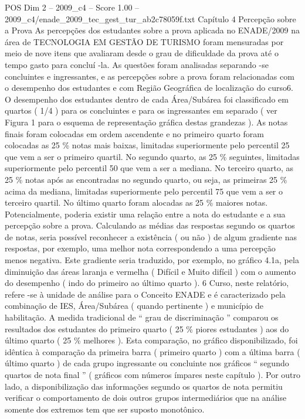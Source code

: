 \begin{textsample}{POS Dim 2 – 2009\_c4 – Score 1.00 – 2009\_c4/enade\_2009\_tec\_gest\_tur\_ab2c78059f.txt}  \label{ex:f2_pos_204}
Capítulo 4 Percepção sobre a Prova As percepções dos estudantes sobre a prova aplicada no ENADE/2009 na área de TECNOLOGIA EM GESTÃO DE TURISMO foram mensuradas por meio de nove itens que avaliaram desde o grau de dificuldade da prova até o tempo gasto para concluí -la.
As questões foram analisadas separando -se concluintes e ingressantes, e as percepções sobre a prova foram relacionadas com o desempenho dos estudantes e com Região Geográfica de localização do curso6.
O desempenho dos estudantes dentro de cada Área/Subárea foi classificado em quartos ( 1/4 ) para os concluintes e para os ingressantes em separado ( ver Figura 1 para o esquema de representação gráfica destas grandezas ).
As notas finais foram colocadas em ordem ascendente e no primeiro quarto foram colocadas as 25 \% notas mais baixas, limitadas superiormente pelo percentil 25 que vem a ser o primeiro quartil.
No segundo quarto, as 25 \% seguintes, limitadas superiormente pelo percentil 50 que vem a ser a mediana.
No terceiro quarto, as 25 \% notas após as encontradas no segundo quarto, ou seja, as primeiras 25 \% acima da mediana, limitadas superiormente pelo percentil 75 que vem a ser o terceiro quartil.
No último quarto foram alocadas as 25 \% maiores notas.
Potencialmente, poderia existir uma relação entre a nota do estudante e a sua percepção sobre a prova.
Calculando as médias das respostas segundo os quartos de notas, seria possível reconhecer a existência ( ou não ) de algum gradiente nas respostas, por exemplo, uma melhor nota correspondendo a uma percepção menos negativa.
Este gradiente seria traduzido, por exemplo, no gráfico 4.1a, pela diminuição das áreas laranja e vermelha ( Difícil e Muito difícil ) com o aumento do desempenho ( indo do primeiro ao último quarto ). 6 Curso, neste relatório, refere -se à unidade de análise para o Conceito ENADE e é caracterizado pela combinação de IES, Área/Subárea ( quando pertinente ) e município de habilitação.
A medida tradicional de “ grau de discriminação ” comparou os resultados dos estudantes do primeiro quarto ( 25 \% piores estudantes ) aos do último quarto ( 25 \% melhores ).
Esta comparação, no gráfico disponibilizado, foi idêntica à comparação da primeira barra ( primeiro quarto ) com a última barra ( último quarto ) de cada grupo ingressante ou concluinte nos gráficos “ segundo quartos de nota final ” ( gráficos com números ímpares neste capítulo ).
Por outro lado, a disponibilização das informações segundo os quartos de nota permitiu verificar o comportamento de dois outros grupos intermediários que na análise somente dos extremos tem que ser suposto monotônico.

\end{textsample}
